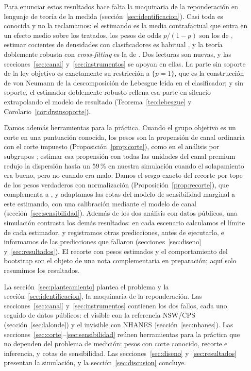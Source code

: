 Para enunciar estos resultados hace falta la maquinaria de la reponderación en lenguaje de teoría de la medida (sección~\ref{sec:identificacion}). Casi toda es conocida y no la reclamamos: el estimando es la media contrafactual que entra en un efecto medio sobre los tratados, los pesos de odds $p/(1-p)$ son los de \citet{hirano2003}, estimar cocientes de densidades con clasificadores es habitual \citep{qin1998,bickel2009,sugiyama2012}, y la teoría doblemente robusta con \emph{cross-fitting} es la de \citet{chernozhukov2018}. Dos lecturas son nuevas, y las secciones~\ref{sec:canal} y~\ref{sec:instrumentos} se apoyan en ellas. La parte sin soporte de la ley objetivo es exactamente su restricción a $\{p=1\}$, que es la construcción de von Neumann de la descomposición de Lebesgue \citep[teorema 6.10]{rudin1987} leída en el clasificador; y sin soporte, el estimador doblemente robusto rellena esa parte en silencio extrapolando el modelo de resultado (Teorema~\ref{teo:lebesgue} y Corolario~\ref{cor:drsinsoporte}).

Damos además herramientas para la práctica. Cuando el grupo objetivo es un corte en una puntuación conocida, los pesos son la propensión de canal ordinaria con el corte impuesto (Proposición~\ref{prop:corte}), como en el análisis por subgrupos \citep{rassen2012}; estimar esa propensión con todas las unidades del canal premium redujo la dispersión hasta un 59\,\% en nuestra simulación cuando el solapamiento era bueno, pero no cuando era malo. Damos el sesgo exacto del recorte por tope de los pesos verdaderos con normalización (Proposición~\ref{prop:recorte}), que complementa a \citet{ma2020}, y adaptamos las cotas del modelo de sensibilidad marginal \citep{tan2006,dorn2023} a este estimando, con una calibración mediante el modelo de canal (sección~\ref{sec:sensibilidad}). Además de los dos análisis con datos públicos, una simulación contrasta los demás resultados: en cada escenario calculamos el límite de cada estimador, y registramos otras predicciones, antes de ejecutarlo, e informamos de las predicciones que fallaron (secciones~\ref{sec:diseno} y~\ref{sec:resultados}). El recorte con pesos estimados y el comportamiento del bootstrap son el objeto de una nota complementaria en preparación; aquí solo resumimos los resultados.

La sección~\ref{sec:planteamiento} plantea el problema y la sección~\ref{sec:identificacion}, la maquinaria de la reponderación. Las secciones~\ref{sec:canal} y~\ref{sec:instrumentos} contienen los dos fallos, cada uno seguido de datos públicos: el visible con la referencia NSW/CPS (sección~\ref{sec:lalonde}) y el invisible con NHANES (sección~\ref{sec:nhanes}). Las secciones~\ref{sec:corte}--\ref{sec:sensibilidad} reúnen herramientas para la práctica que no dependen del problema de medición: pesos con corte conocido, recorte e inferencia, y cotas de sensibilidad. Las secciones~\ref{sec:diseno} y~\ref{sec:resultados} presentan la simulación, y la sección~\ref{sec:discusion} concluye.

